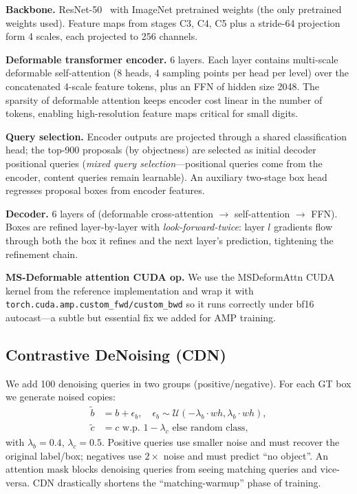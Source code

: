 \documentclass[10pt,twocolumn,letterpaper]{article}
\begin{document}
\textbf{Backbone.} ResNet-50~\cite{he2016resnet} with ImageNet pretrained weights (the only pretrained weights used). Feature maps from stages C3, C4, C5 plus a stride-64 projection form 4 scales, each projected to 256 channels.

\textbf{Deformable transformer encoder.} 6 layers. Each layer contains multi-scale deformable self-attention (8 heads, 4 sampling points per head per level) over the concatenated 4-scale feature tokens, plus an FFN of hidden size 2048. The sparsity of deformable attention keeps encoder cost linear in the number of tokens, enabling high-resolution feature maps critical for small digits.

\textbf{Query selection.} Encoder outputs are projected through a shared classification head; the top-900 proposals (by objectness) are selected as initial decoder positional queries (\emph{mixed query selection}---positional queries come from the encoder, content queries remain learnable). An auxiliary two-stage box head regresses proposal boxes from encoder features.

\textbf{Decoder.} 6 layers of (deformable cross-attention $\to$ self-attention $\to$ FFN). Boxes are refined layer-by-layer with \emph{look-forward-twice}: layer $l$ gradients flow through both the box it refines and the next layer's prediction, tightening the refinement chain.

\textbf{MS-Deformable attention CUDA op.} We use the MSDeformAttn CUDA kernel from the reference implementation and wrap it with \texttt{torch.cuda.amp.custom\_fwd/custom\_bwd} so it runs correctly under bf16 autocast---a subtle but essential fix we added for AMP training.

\subsection{Contrastive DeNoising (CDN)}
We add 100 denoising queries in two groups (positive/negative). For each GT box we generate noised copies:
\begin{align*}
  \tilde{b} &= b + \epsilon_b, \quad \epsilon_b \sim \mathcal{U}(-\lambda_b \cdot wh, \lambda_b \cdot wh),\\
  \tilde{c} &= c \text{ w.p. } 1-\lambda_c \text{ else random class},
\end{align*}
with $\lambda_b = 0.4$, $\lambda_c = 0.5$. Positive queries use smaller noise and must recover the original label/box; negatives use $2\times$ noise and must predict ``no object''. An attention mask blocks denoising queries from seeing matching queries and vice-versa. CDN drastically shortens the ``matching-warmup'' phase of training.
\end{document}
